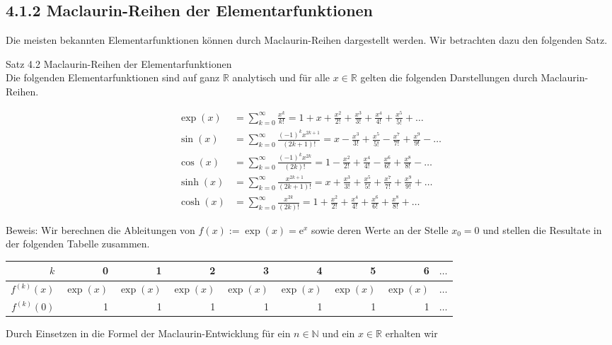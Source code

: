 \documentclass[10pt]{article}
\begin{document}
\subsection*{4.1.2 Maclaurin-Reihen der Elementarfunktionen}
Die meisten bekannten Elementarfunktionen können durch Maclaurin-Reihen dargestellt werden. Wir betrachten dazu den folgenden Satz.

Satz 4.2 Maclaurin-Reihen der Elementarfunktionen\\
Die folgenden Elementarfunktionen sind auf ganz $\mathbb{R}$ analytisch und für alle $x \in \mathbb{R}$ gelten die folgenden Darstellungen durch Maclaurin-Reihen.


\begin{align*}
\exp (x) & =\sum_{k=0}^{\infty} \frac{x^{k}}{k!}=1+x+\frac{x^{2}}{2!}+\frac{x^{3}}{3!}+\frac{x^{4}}{4!}+\frac{x^{5}}{5!}+\ldots \\
\sin (x) & =\sum_{k=0}^{\infty} \frac{(-1)^{k} x^{2 k+1}}{(2 k+1)!}=x-\frac{x^{3}}{3!}+\frac{x^{5}}{5!}-\frac{x^{7}}{7!}+\frac{x^{9}}{9!}-\ldots \\
\cos (x) & =\sum_{k=0}^{\infty} \frac{(-1)^{k} x^{2 k}}{(2 k)!}=1-\frac{x^{2}}{2!}+\frac{x^{4}}{4!}-\frac{x^{6}}{6!}+\frac{x^{8}}{8!}-\ldots  \tag{4.11}\\
\sinh (x) & =\sum_{k=0}^{\infty} \frac{x^{2 k+1}}{(2 k+1)!}=x+\frac{x^{3}}{3!}+\frac{x^{5}}{5!}+\frac{x^{7}}{7!}+\frac{x^{9}}{9!}+\ldots \\
\cosh (x) & =\sum_{k=0}^{\infty} \frac{x^{2 k}}{(2 k)!}=1+\frac{x^{2}}{2!}+\frac{x^{4}}{4!}+\frac{x^{6}}{6!}+\frac{x^{8}}{8!}+\ldots
\end{align*}


Beweis: Wir berechnen die Ableitungen von $f(x):=\exp (x)=\mathrm{e}^{x}$ sowie deren Werte an der Stelle $x_{0}=0$ und stellen die Resultate in der folgenden Tabelle zusammen.

\begin{center}
\begin{tabular}{|r|r|r|r|r|r|r|r|r|}
\hline
$k$ & 0 & 1 & 2 & 3 & 4 & 5 & 6 & $\ldots$ \\
\hline\hline
$f^{(k)}(x)$ & $\exp (x)$ & $\exp (x)$ & $\exp (x)$ & $\exp (x)$ & $\exp (x)$ & $\exp (x)$ & $\exp (x)$ & $\ldots$ \\
\hline
$f^{(k)}(0)$ & 1 & 1 & 1 & 1 & 1 & 1 & 1 & $\ldots$ \\
\hline
\end{tabular}
\end{center}

Durch Einsetzen in die Formel der Maclaurin-Entwicklung für ein $n \in \mathbb{N}$ und ein $x \in \mathbb{R}$ erhalten wir
\end{document}
